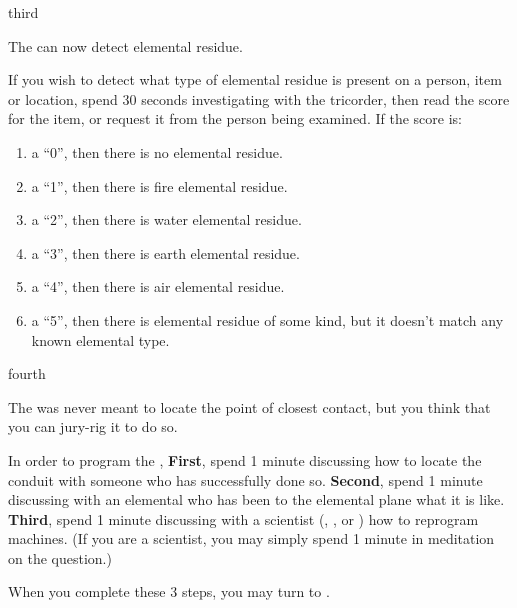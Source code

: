 \documentclass[notebook]{elementals}
\begin{document}
\begin{page}{third}

The \iTricorder{} can now detect elemental residue.

If you wish to detect what type of elemental residue is present on a person, item or location, spend 30 seconds investigating with the tricorder, then read the \alpha score for the item, or request it from the person being examined. If the score is:

\begin{enumerate}
  \item a ``0'', then there is no elemental residue.
  \item a ``1'', then there is fire elemental residue.
  \item a ``2'', then there is water elemental residue.
  \item a ``3'', then there is earth elemental residue.
  \item a ``4'', then there is air elemental residue.
  \item a ``5'', then there is elemental residue of some kind, but it doesn't match any known elemental type.
\end{enumerate}

\end{page}

\begin{page}{fourth}

The \iTricorder{} was never meant to locate the point of closest contact, but you think that you can jury-rig it to do so.

In order to program the \iTricorder{}, {\bf First}, spend 1 minute discussing how to locate the conduit with someone who has successfully done so. {\bf Second}, spend 1 minute discussing with an elemental who has been to the elemental plane what it is like. {\bf Third}, spend 1 minute discussing with a scientist (\cGD{}, \cScientist{}, or \cMS{}) how to reprogram machines. (If you are a scientist, you may simply spend 1 minute in meditation on the question.)

When you complete these 3 steps, you may turn to .

\end{page}
\end{document}
